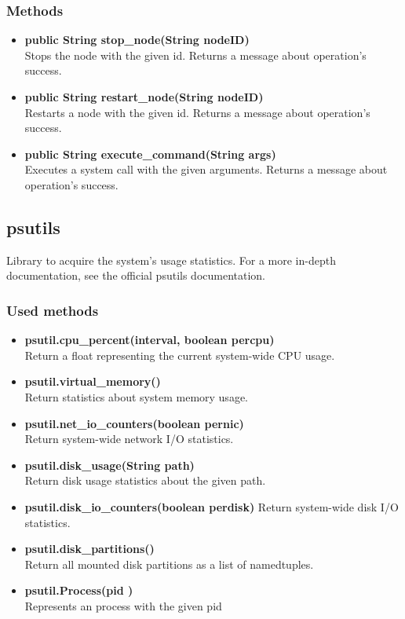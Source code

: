 \subsubsection{Methods}
\begin{itemize}
	\item \textbf{public String stop\_node(String nodeID)}\\
	Stops the node with the given id.
	Returns a message about operation's success.
	\item \textbf{public String restart\_node(String nodeID)}\\
	Restarts a node with the given id.
	Returns a message about operation's success.
	\item \textbf{public String execute\_command(String args)}\\
	Executes a system call with the given arguments.
	Returns a message about operation's success.
\end{itemize}


\subsection{psutils}
Library to acquire the system's usage statistics. For a more in-depth documentation, see the official psutils documentation.

\subsubsection{Used methods}
\begin{itemize}
	\item \textbf{psutil.cpu\_percent(interval, boolean percpu)}\\
	Return a float representing the current system-wide CPU usage.
	\item \textbf{psutil.virtual\_memory()}\\
	Return statistics about system memory usage.
	\item \textbf{psutil.net\_io\_counters(boolean pernic)}\\
	Return system-wide network I/O statistics.
	\item \textbf{psutil.disk\_usage(String path)}\\
	Return disk usage statistics about the given path.
	\item \textbf{psutil.disk\_io\_counters(boolean perdisk)}
	Return system-wide disk I/O statistics.
	\item \textbf{psutil.disk\_partitions()}\\
	Return all mounted disk partitions as a list of namedtuples.
	\item \textbf{psutil.Process(pid )}\\
	Represents an  process with the given pid
\end{itemize}


	